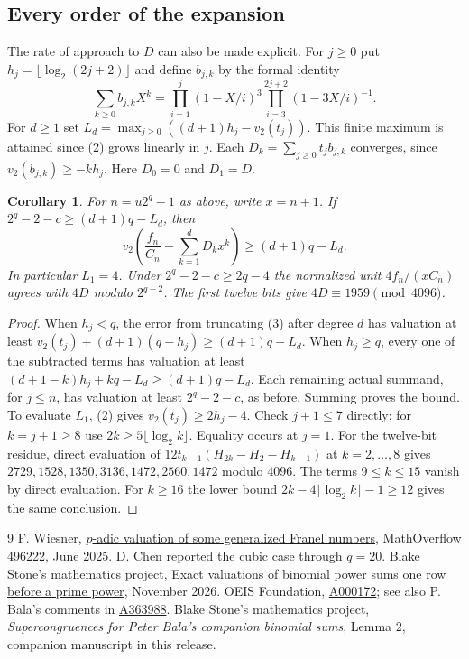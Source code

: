 \documentclass[11pt]{article}
\newtheorem{corollary}[theorem]{Corollary}
\newcommand{\ord}{v_2}
\begin{document}
\subsection*{Every order of the expansion}
The rate of approach to $D$ can also be made explicit. For $j\ge0$ put $h_j=\lfloor\log_2(2j+2)\rfloor$ and define $b_{j,k}$ by the formal identity
\[
 \sum_{k\ge0}b_{j,k}X^k=\prod_{i=1}^j(1-X/i)^3
                  \prod_{i=3}^{2j+2}(1-3X/i)^{-1}.
\]
For $d\ge1$ set $L_d=\max_{j\ge0}((d+1)h_j-\ord(t_j))$. This finite maximum is attained since (2) grows linearly in $j$. Each $D_k=\sum_{j\ge0}t_j b_{j,k}$ converges, since $\ord(b_{j,k})\ge-kh_j$. Here $D_0=0$ and $D_1=D$.
\begin{corollary}
For $n=u2^q-1$ as above, write $x=n+1$. If $2^q-2-c\ge(d+1)q-L_d$, then
\[
 \ord\!\left(\frac{f_n}{C_n}-\sum_{k=1}^d D_k x^k\right)\ge(d+1)q-L_d.
\]
In particular $L_1=4$. Under $2^q-2-c\ge2q-4$ the normalized unit $4f_n/(xC_n)$ agrees with $4D$ modulo $2^{q-2}$. The first twelve bits give $4D\equiv1959\pmod {4096}$.
\end{corollary}
\begin{proof}
When $h_j<q$, the error from truncating (3) after degree $d$ has valuation at least $\ord(t_j)+(d+1)(q-h_j)\ge(d+1)q-L_d$. When $h_j\ge q$, every one of the subtracted terms has valuation at least $(d+1-k)h_j+kq-L_d\ge(d+1)q-L_d$. Each remaining actual summand, for $j\le n$, has valuation at least $2^q-2-c$, as before. Summing proves the bound. To evaluate $L_1$, (2) gives $\ord(t_j)\ge 2h_j-4$. Check $j+1\le7$ directly; for $k=j+1\ge8$ use $2k\ge5\lfloor\log_2 k\rfloor$. Equality occurs at $j=1$. For the twelve-bit residue, direct evaluation of $12t_{k-1}(H_{2k}-H_2-H_{k-1})$ at $k=2,\ldots,8$ gives $2729,1528,1350,3136,1472,2560,1472$ modulo $4096$. The terms $9\le k\le15$ vanish by direct evaluation. For $k\ge16$ the lower bound $2k-4\lfloor\log_2 k\rfloor-1\ge12$ gives the same conclusion.
\end{proof}

\begin{thebibliography}{9}
 F. Wiesner, \href{https://mathoverflow.net/q/496222}{$p$-adic valuation of some generalized Franel numbers}, MathOverflow 496222, June 2025. D. Chen reported the cubic case through $q=20$.
 Blake Stone's mathematics project, \href{https://github.com/blakestone-x/math/tree/8aa1a2147fbce9c321e96e6a90c3099805f2e495/Franel-prime-power-rows}{Exact valuations of binomial power sums one row before a prime power}, November 2026.
 OEIS Foundation, \href{https://oeis.org/A000172}{A000172}; see also P. Bala's comments in \href{https://oeis.org/A363988}{A363988}.
 Blake Stone's mathematics project, \emph{Supercongruences for Peter Bala's companion binomial sums}, Lemma 2, companion manuscript in this release.
\end{thebibliography}
\end{document}
